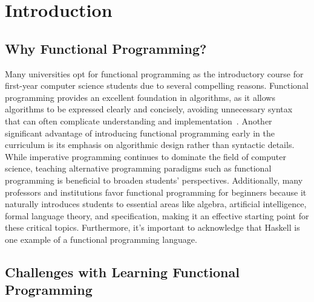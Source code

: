 \chapter{Introduction}

\section{Why Functional Programming?}

Many universities opt for functional programming as the introductory course for first-year computer science students due to several compelling reasons. Functional programming provides an excellent foundation in algorithms, as it allows algorithms to be expressed clearly and concisely, avoiding unnecessary syntax that can often complicate understanding and implementation~\cite{joosten1993teaching}. Another significant advantage of introducing functional programming early in the curriculum is its emphasis on algorithmic design rather than syntactic details. While imperative programming continues to dominate the field of computer science, teaching alternative programming paradigms such as functional programming is beneficial to broaden students' perspectives. Additionally, many professors and institutions favor functional programming for beginners because it naturally introduces students to essential areas like algebra, artificial intelligence, formal language theory, and specification, making it an effective starting point for these critical topics. Furthermore, it's important to acknowledge that Haskell is one example of a functional programming language.

\section{Challenges with Learning Functional Programming}

